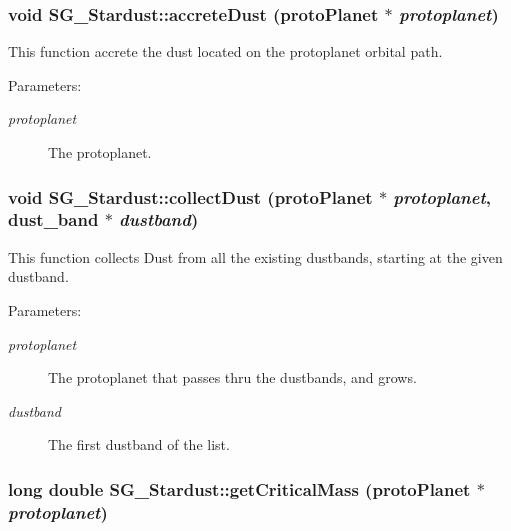 \subsubsection{\setlength{\rightskip}{0pt plus 5cm}void SG\_\-Stardust::accrete\-Dust (proto\-Planet $\ast$ {\em protoplanet})\hspace{0.3cm}{\tt  [protected]}}\label{class_s_g___stardust_b4}


This function accrete the dust located on the protoplanet orbital path. 

\begin{Desc}
\item[Parameters:]
\begin{description}
\item[{\em protoplanet}]The protoplanet. \end{description}
\end{Desc}
\subsubsection{\setlength{\rightskip}{0pt plus 5cm}void SG\_\-Stardust::collect\-Dust (proto\-Planet $\ast$ {\em protoplanet}, dust\_\-band $\ast$ {\em dustband})\hspace{0.3cm}{\tt  [protected]}}\label{class_s_g___stardust_b7}


This function collects Dust from all the existing dustbands, starting at the given dustband. 

\begin{Desc}
\item[Parameters:]
\begin{description}
\item[{\em protoplanet}]The protoplanet that passes thru the dustbands, and grows. \item[{\em dustband}]The first dustband of the list. \end{description}
\end{Desc}
\subsubsection{\setlength{\rightskip}{0pt plus 5cm}long double SG\_\-Stardust::get\-Critical\-Mass (proto\-Planet $\ast$ {\em protoplanet})\hspace{0.3cm}{\tt  [protected]}}\label{class_s_g___stardust_b3}


